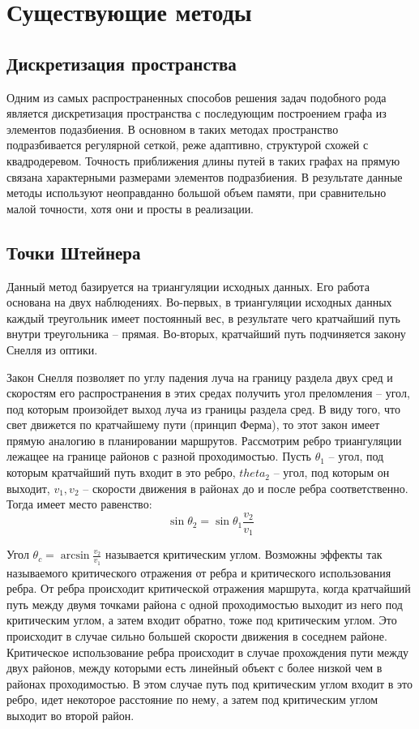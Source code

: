 \chapter{Существующие методы}

\section{Дискретизация пространства}

Одним из самых распространенных способов решения задач подобного рода является
дискретизация пространства с последующим построением графа из элементов подазбиения.
В основном в таких методах пространство подразбивается регулярной сеткой, реже
адаптивно, структурой схожей с квадродеревом. Точность приближения длины путей
в таких графах на прямую связана характерными размерами элементов подразбиения.
В результате данные методы используют неоправданно большой объем памяти, при
сравнительно малой точности, хотя они и просты в реализации.

\section{Точки Штейнера}
Данный метод базируется на триангуляции исходных данных.
Его работа основана  на двух наблюдениях. Во-первых, в триангуляции исходных
данных каждый треугольник имеет постоянный вес, в результате чего кратчайший
путь внутри треугольника -- прямая. Во-вторых, кратчайший путь подчиняется
закону Снелля из оптики.

Закон Снелля позволяет по углу падения луча на границу раздела двух сред и
скоростям его распространения в этих средах получить угол преломления --
угол, под которым произойдет выход луча из границы раздела сред.
В виду того, что свет движется по кратчайшему пути (принцип Ферма), то этот закон
имеет прямую аналогию в планировании маршрутов.
Рассмотрим ребро триангуляции лежащее на границе районов с разной проходимостью.
Пусть $\theta_1$ -- угол, под которым кратчайший путь входит в это ребро,
$theta_2$ -- угол, под которым он выходит, $v_1, v_2$ -- скорости движения
в районах до и после ребра соответственно. Тогда имеет место равенство:
\begin{equation}
\sin\theta_2 = \sin\theta_1\frac{v_2}{v_1}
\end{equation}

Угол $\theta_c = \arcsin\frac{v_2}{v_1}$ называется критическим углом.
Возможны эффекты так называемого критического отражения от ребра и
критического использования ребра. От ребра происходит критической
отражения маршрута, когда кратчайший путь между двумя точками района
с одной проходимостью выходит из него под критическим углом, а затем
входит обратно, тоже под критическим углом. Это происходит в случае
сильно большей скорости движения в соседнем районе. Критическое
использование ребра происходит в случае прохождения пути между двух районов,
между которыми есть линейный объект с более низкой чем в районах проходимостью.
В этом случае путь под критическим углом входит в это ребро, идет некоторое
расстояние по нему, а затем под критическим углом выходит во второй район.

